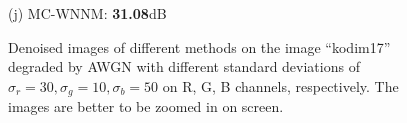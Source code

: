 \documentclass[10pt,onecolumn,letterpaper]{article}
\begin{document}
\begin{figure}[!htbp]
{\begin{minipage}[t]{0.24\textwidth}
{\footnotesize (j) MC-WNNM: \textbf{31.08}dB}
\end{minipage}
}
\caption{Denoised images of different methods on the image ``kodim17'' degraded by AWGN with different standard deviations of $\sigma_{r}=30, \sigma_{g}=10, \sigma_{b}=50$ on R, G, B channels, respectively. The images are better to be zoomed in on screen.}
\label{f3}
\end{figure}

\begin{figure}[!htbp]
\centering
{}
\end{figure}
\end{document}
